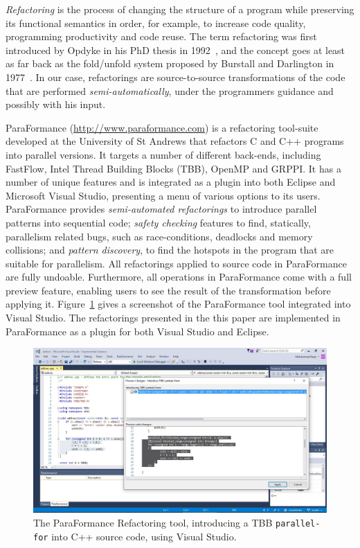 \noindent
\emph{Refactoring} is the process of changing the structure of a program while preserving
its functional semantics in order, for example, to increase code quality, programming
productivity and code reuse. The term refactoring was first introduced by Opdyke in his PhD thesis in 1992~\cite{opdyke}, and the concept goes at least as far back as the fold/unfold system proposed by Burstall and Darlington in 1977~\cite{darlington77}. In our case, refactorings are source-to-source transformations of the code that are performed \emph{semi-automatically}, under the programmers guidance and possibly with his input. 

%
%
%

ParaFormance (\url{http://www.paraformance.com}) is a refactoring tool-suite developed at the University of St Andrews that refactors C and C++ programs into parallel versions. It targets a number of different back-ends, including FastFlow, Intel Thread Building Blocks (TBB), OpenMP and GRPPI. It has a number of unique features and is integrated as a plugin into both Eclipse and Microsoft Visual Studio, presenting a menu of various options to its users. ParaFormance provides \emph{semi-automated refactorings} to introduce parallel patterns into sequential code; \emph{safety checking} features to find, statically, parallelism related bugs, such as race-conditions, deadlocks and memory collisions; and \emph{pattern discovery}, to find the hotspots in the program that are suitable for parallelism. All refactorings applied to source code in ParaFormance are fully undoable. Furthermore, all operations in ParaFormance come with a full preview feature, enabling users to see the result of the transformation before applying it. Figure~\ref{fig:paraformance1} gives a screenshot of the ParaFormance tool integrated into Visual Studio. The refactorings presented in the this paper are implemented in ParaFormance as a plugin for both Visual Studio and Eclipse.

\begin{figure}
    \centering
    \includegraphics[scale=0.3]{figures/TBBLambda.jpg}
    \caption{The ParaFormance Refactoring tool, introducing a TBB \texttt{parallel-for} into C++ source code, using Visual Studio.}
    \label{fig:paraformance1}
\end{figure}

